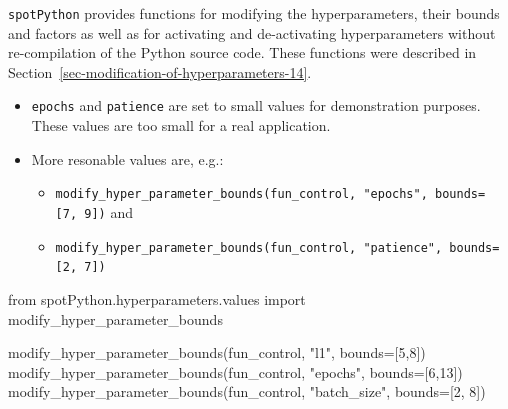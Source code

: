 \documentclass[
  letterpaper,
  DIV=11,
  numbers=noendperiod]{scrreprt}
\newenvironment{Shaded}{\begin{snugshade}}{\end{snugshade}}
\newcommand{\DecValTok}[1]{\textcolor[rgb]{0.68,0.00,0.00}{#1}}
\newcommand{\ImportTok}[1]{\textcolor[rgb]{0.00,0.46,0.62}{#1}}
\newcommand{\NormalTok}[1]{\textcolor[rgb]{0.00,0.23,0.31}{#1}}
\newcommand{\OperatorTok}[1]{\textcolor[rgb]{0.37,0.37,0.37}{#1}}
\newcommand{\StringTok}[1]{\textcolor[rgb]{0.13,0.47,0.30}{#1}}
\providecommand{\tightlist}{%
  \setlength{\itemsep}{0pt}\setlength{\parskip}{0pt}}\usepackage{longtable,booktabs,array}
\begin{document}
\texttt{spotPython} provides functions for modifying the
hyperparameters, their bounds and factors as well as for activating and
de-activating hyperparameters without re-compilation of the Python
source code. These functions were described in
Section~\ref{sec-modification-of-hyperparameters-14}.

\begin{tcolorbox}[enhanced jigsaw, titlerule=0mm, colbacktitle=quarto-callout-caution-color!10!white, coltitle=black, arc=.35mm, toptitle=1mm, colback=white, left=2mm, opacityback=0, bottomtitle=1mm, bottomrule=.15mm, breakable, opacitybacktitle=0.6, colframe=quarto-callout-caution-color-frame, rightrule=.15mm, toprule=.15mm, leftrule=.75mm, title=\textcolor{quarto-callout-caution-color}{\faFire}\hspace{0.5em}{Caution: Small number of epochs for demonstration purposes}]

\begin{itemize}
\tightlist
\item
  \texttt{epochs} and \texttt{patience} are set to small values for
  demonstration purposes. These values are too small for a real
  application.
\item
  More resonable values are, e.g.:

  \begin{itemize}
  \tightlist
  \item
    \texttt{modify\_hyper\_parameter\_bounds(fun\_control,\ "epochs",\ bounds={[}7,\ 9{]})}
    and
  \item
    \texttt{modify\_hyper\_parameter\_bounds(fun\_control,\ "patience",\ bounds={[}2,\ 7{]})}
  \end{itemize}
\end{itemize}

\end{tcolorbox}

\begin{Shaded}
\begin{Highlighting}[]
\ImportTok{from}\NormalTok{ spotPython.hyperparameters.values }\ImportTok{import}\NormalTok{ modify\_hyper\_parameter\_bounds}

\NormalTok{modify\_hyper\_parameter\_bounds(fun\_control, }\StringTok{"l1"}\NormalTok{, bounds}\OperatorTok{=}\NormalTok{[}\DecValTok{5}\NormalTok{,}\DecValTok{8}\NormalTok{])}
\NormalTok{modify\_hyper\_parameter\_bounds(fun\_control, }\StringTok{"epochs"}\NormalTok{, bounds}\OperatorTok{=}\NormalTok{[}\DecValTok{6}\NormalTok{,}\DecValTok{13}\NormalTok{])}
\NormalTok{modify\_hyper\_parameter\_bounds(fun\_control, }\StringTok{"batch\_size"}\NormalTok{, bounds}\OperatorTok{=}\NormalTok{[}\DecValTok{2}\NormalTok{, }\DecValTok{8}\NormalTok{])}
\end{Highlighting}
\end{Shaded}
\end{document}
